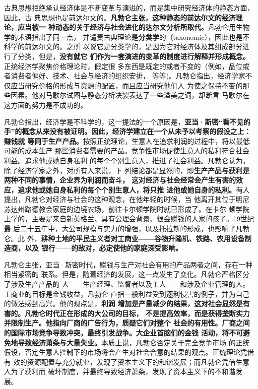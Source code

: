 古典思想拒绝承认经济体是不断变革与演进的，而是集中研究经济体的静态方面，因此，古
典思想也是前达尔文的。\textbf{凡勃仑主张，这种静态的前达尔文的经济理论，应当被一
  种动态的关于经济与社会进化的达尔文分析所取代。}凡勃仑用生物学的术语指出了同一点，
并谴责古典理论是\textbf{分类学}的（taxonomic），因此也是不科学的前达尔文的。之所
以说它是分类学的，是因为它对经济体及其组成部分进行了分类，但是，\textbf{没有就它
  们作为一套演进的变革的制度进行解释并形成概念。}正统经济学聚焦价格理论时，假定很
多东西是既定的或者不变的（例如，品位或者消费者偏好、技术、社会与经济的组织安排，
等等)。凡勃仑指出，经济学家不仅应当研究价格的形成与资源的配置，而且应当研究他们人
为使之保持不变的那些因素。他对马歇尔试图与静态分析决裂表达了一些溢美之词，却断言
马歇尔在这方面的努力是不成功的。

凡勃仑指出，经济学是不科学的，这一提法的一个原因是，\textbf{亚当·斯密“看不见的
  手”的概念从来没有被证明。因此，经济学建立在一个从未予以考察的假设之上：赚钱就
  等同于生产产品。}按照正统理论，生意人在追求利润的过程中，将以最低可能的成本生产
那些消费者需要的产品。竞争性市场促使生意人的私利符合社会利益。追求他或她自身私利
的每个个别生意人，推进了社会利益。凡勃仑认为，除了经济学家之外，对所有人来说，下
列结论都是显然的，即\textbf{生产产品与获利是两种不同的事情，企业界为利润而奋斗，
  这对经济与社会经常会产生有害的效应，追求他或她自身私利的每个个别生意人，将只推
  进他或她自身的私利。}有人提出，凡勃仑对经济与社会的这种观念，在他年轻的时候，当
他离开其位于明尼苏达州路德教会家庭的边境农场，前往卡尔顿学院时就已形成了。在卡尔
顿学院上学的，主要是来自新英格兰、具有公理会背景、很会赚钱的人家的孩子。19世纪最
后二十五年中，大公司规模与实力的增强，以及托拉斯的形成，也影响了凡勃仑。此
外，\textbf{耕种土地的平民主义者对工商业——谷物升隆机、铁路、农用设备制造商，以及
  银行——的敌对，必定使他的家庭深受影响。}

凡勃仑主张，亚当·斯密时代，赚钱与生产对社会有用的产品两者之间，存在一种相当紧密的
联系。但是，随着经济的发展，这一点发生了变化。凡勃仑严格区分了涉及生产产品的
人——生产经理、监督者以及工人——和涉及企业管理的人。工商业的目标是金钱收益，凡勃仑
直指一般利益受到逐利侵害的例子，并为自己的做法感到高兴。他的观点是，\textbf{利润
  增加是产量减少的结果，这对社会显然是有害的。凡勃仑时代正在形成的大公司的目标，
  不是提高效率，而是获得垄断实力并限制生产。他指向厂商的广告行为，质疑它们对整个
  社会的有用性。厂商之间的国际市场竞争导致冲突，最终引发战争。大企业首脑们的金钱
  活动，将不可避免地导致经济萧条与大量失业。}本质上说，凡勃仑否定关于完全竞争市场
的正统假设，否定生意人控制下的市场将会产生对社会合意的结果的观点。正统理论凭借有
效的资源配置与充分就业，发现了资本主义下的和谐发展；而凡勃仑凭借生意人为了获利而
破坏制度，并最终导致经济萧条，发现了资本主义下的不和谐发展。

